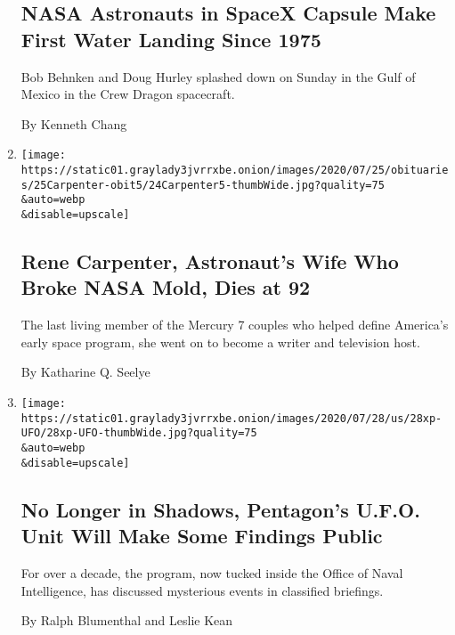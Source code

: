 \begin{enumerate}
{  \subsection{NASA Astronauts in SpaceX Capsule Make First Water Landing
  Since
  1975}\label{nasa-astronauts-in-spacex-capsule-make-first-water-landing-since-1975}}

  Bob Behnken and Doug Hurley splashed down on Sunday in the Gulf of
  Mexico in the Crew Dragon spacecraft.

  By Kenneth Chang
\item
  \href{/2020/07/24/us/rene-carpenter-dead.html}{}

  \texttt{[image: https://static01.graylady3jvrrxbe.onion/images/2020/07/25/obituaries/25Carpenter-obit5/24Carpenter5-thumbWide.jpg?quality=75\\\&auto=webp\\\&disable=upscale]}

  \hypertarget{rene-carpenter-astronauts-wife-who-broke-nasa-mold-dies-at-92}{%
  \subsection{Rene Carpenter, Astronaut's Wife Who Broke NASA Mold, Dies
  at
  92}\label{rene-carpenter-astronauts-wife-who-broke-nasa-mold-dies-at-92}}

  The last living member of the Mercury 7 couples who helped define
  America's early space program, she went on to become a writer and
  television host.

  By Katharine Q. Seelye
\item
  \href{/2020/07/23/us/politics/pentagon-ufo-harry-reid-navy.html}{}

  \texttt{[image: https://static01.graylady3jvrrxbe.onion/images/2020/07/28/us/28xp-UFO/28xp-UFO-thumbWide.jpg?quality=75\\\&auto=webp\\\&disable=upscale]}

  \hypertarget{no-longer-in-shadows-pentagons-ufo-unit-will-make-some-findings-public}{%
  \subsection{No Longer in Shadows, Pentagon's U.F.O. Unit Will Make
  Some Findings
  Public}\label{no-longer-in-shadows-pentagons-ufo-unit-will-make-some-findings-public}}

  For over a decade, the program, now tucked inside the Office of Naval
  Intelligence, has discussed mysterious events in classified briefings.

  By Ralph Blumenthal and Leslie Kean


\end{enumerate}
